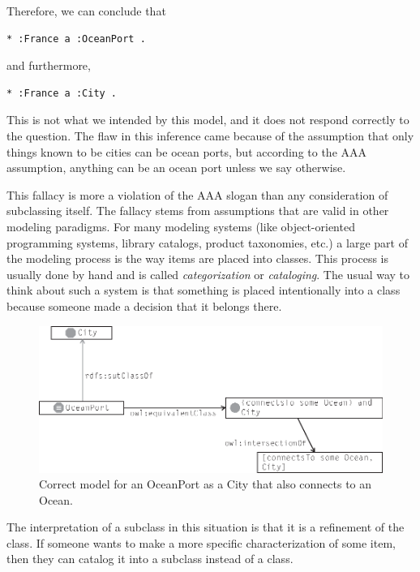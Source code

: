 Therefore, we can conclude that

\begin{lstlisting}
* :France a :OceanPort .
\end{lstlisting}

and furthermore,

\begin{lstlisting}
* :France a :City .
\end{lstlisting}

This is not what we intended by this model, and it does not respond
correctly to the question. The flaw in this inference came because of
the assumption that only things known to be cities can be ocean ports,
but according to the AAA assumption, anything can be an ocean port
unless we say otherwise.

This fallacy is more a violation of the AAA slogan than any
consideration of subclassing itself. The
fallacy stems from assumptions that are valid in other modeling
paradigms. For many modeling systems (like object-oriented programming
systems, library catalogs, product taxonomies, etc.) a large part of the
modeling process is the way items are placed into classes. This process
is usually done by hand and is called \emph{categorization} or \emph{cataloging}. The
usual way to think about such a system is that something is placed
intentionally into a class because someone made a decision that it
belongs there.



\begin{figure}
\centering
\includegraphics[width=5in]{SWWOv3/media/ch15/f15-03.eps}
\caption{Correct model for an OceanPort as a City that also connects to an Ocean.}
\label{fig:ch15.03}
\end{figure}



The interpretation of a subclass in this situation is that it is a
refinement of the class. If someone wants to make a more specific
characterization of some item, then they can catalog it into a subclass
instead of a class.

